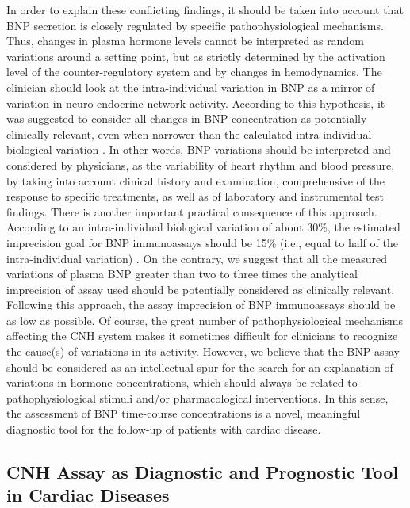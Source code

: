 \documentclass[14pt,a4paper,onecolumn]{extarticle}
\begin{document}
In order to explain these conflicting findings, it should be taken into account that
BNP secretion is closely regulated by specific pathophysiological mechanisms. Thus,
changes in plasma hormone levels cannot be interpreted as random variations around
a setting point, but as strictly determined by the activation level of the counter-regulatory system and by changes in hemodynamics. The clinician should look at the intra-individual variation in BNP as a mirror of variation in neuro-endocrine network activity.
According to this hypothesis, it was suggested to consider all changes in BNP concentration as potentially clinically relevant, even when narrower than the calculated
intra-individual biological variation \citep{bib3103}. In other words, BNP variations should be
interpreted and considered by physicians, as the variability of heart rhythm and blood
pressure, by taking into account clinical history and examination, comprehensive of the
response to specific treatments, as well as of laboratory and instrumental test findings.
There is another important practical consequence of this approach. According to an
intra-individual biological variation of about 30\%, the estimated imprecision goal for
BNP immunoassays should be 15\% (i.e., equal to half of the intra-individual variation)
\citep{bib395} \citep{bib396}. On the contrary, we suggest that all the measured variations of plasma BNP
greater than two to three times the analytical imprecision of assay used should be potentially considered as clinically relevant. Following this approach, the assay imprecision
of BNP immunoassays should be as low as possible.
Of course, the great number of pathophysiological mechanisms affecting the CNH
system makes it sometimes difficult for clinicians to recognize the cause(s) of variations
in its activity. However, we believe that the BNP assay should be considered as an intellectual spur for the search for an explanation of variations in hormone concentrations,
which should always be related to pathophysiological stimuli and/or pharmacological
interventions. In this sense, the assessment of BNP time-course concentrations is a novel,
meaningful diagnostic tool for the follow-up of patients with cardiac disease.

\subsection{ CNH Assay as Diagnostic and Prognostic Tool in Cardiac Diseases}
\end{document}
